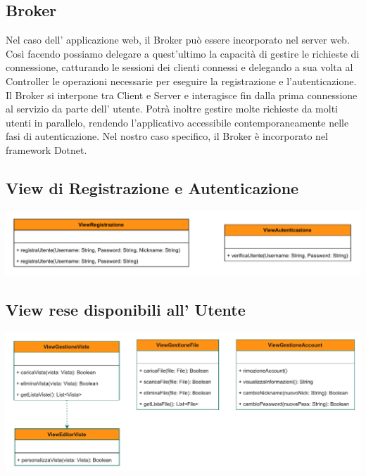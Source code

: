 \pagebreak
\subsection*{Broker}
{}
Nel caso dell' applicazione web, il Broker può essere incorporato nel server web.
\\Così facendo possiamo delegare a quest'ultimo la capacità di gestire le richieste di connessione, catturando le sessioni dei clienti connessi e delegando a sua volta al Controller le operazioni necessarie per eseguire la registrazione e l'autenticazione.\\
Il Broker si interpone tra Client e Server e interagisce fin dalla prima connessione al servizio da parte dell' utente. Potrà inoltre gestire molte richieste da molti utenti in parallelo, rendendo l'applicativo accessibile contemporaneamente nelle fasi di autenticazione.
Nel nostro caso specifico, il Broker è incorporato nel framework Dotnet. 
\vspace{0.5cm}



\subsection*{View di Registrazione e Autenticazione}
\begin{adjustwidth}{-2cm}{0cm}
\includegraphics[scale=0.8]{progettazione/Progettazione-Interfacce Disponibili Registrazione_Autenticazione.drawio.pdf}
\end{adjustwidth}
\vspace{0.5cm}
\vspace{0.5cm}




\subsection*{View rese disponibili all' Utente}
\begin{adjustwidth}{-2cm}{0cm}
\includegraphics[scale=0.9]{progettazione/Progettazione-Interfacce Disponibili all' Utente.drawio.pdf}
\end{adjustwidth}
\vspace{0.5cm}
\vspace{0.5cm}



